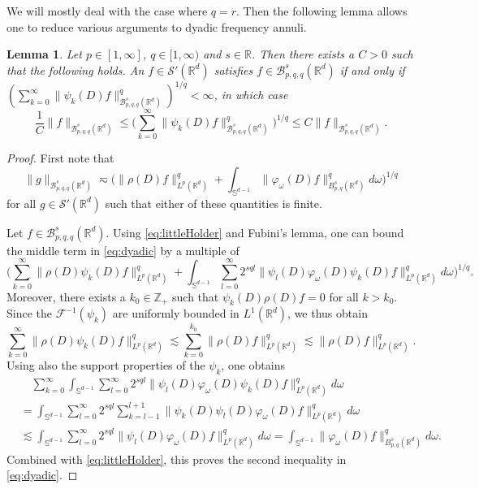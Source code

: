 \documentclass{amsart}
\newtheorem{lemma}[theorem]{Lemma}
\theoremstyle{definition}
\newcommand{\R}{\mathbb{R}}
\newcommand{\Z}{\mathbb{Z}}
\newcommand {\Rd}{\mathbb{R}^{d}}
\newcommand {\w}{\omega}
\newcommand {\ph}{\varphi}
\newcommand {\Baspqq}{\mathcal{B}^{s}_{p,q,q}(\Rd)}
\newcommand {\Sw}{\mathcal{S}}
\newcommand {\F}{{\mathcal{F}}}
\numberwithin{equation}{section}
\begin{document}
We will mostly deal with the case where $q=r$. Then 
the following lemma allows one to reduce various arguments to dyadic frequency annuli. 

\begin{lemma}\label{lem:dyadic}
Let $p\in[1,\infty]$, $q\in[1,\infty)$ and $s\in\R$. Then there exists a $C>0$ such that the following holds. An $f\in\Sw'(\Rd)$ satisfies $f\in \Baspqq$ if and only if $(\sum_{k=0}^{\infty}\|\psi_{k}(D)f\|_{\Baspqq}^{q})^{1/q}<\infty$, in which case
\begin{equation}\label{eq:dyadic}
\frac{1}{C}\|f\|_{\Baspqq}\leq \Big(\sum_{k=0}^{\infty}\|\psi_{k}(D)f\|_{\Baspqq}^{q}\Big)^{1/q}\leq C\|f\|_{\Baspqq}.
\end{equation}
\end{lemma}
\begin{proof}
First note that
\begin{equation}\label{eq:littleHolder}
\|g\|_{\Baspqq}\eqsim \Big(\| \rho(D) f \|_{L^p(\R^d)}^{q} + \int_{\mathbb{S}^{d-1}} \|\varphi_\omega(D) f \|^q_{B^{s}_{p,q}(\Rd)} d\omega \Big)^{1/q}
\end{equation}
for all $g\in\Sw'(\Rd)$ such that either of these quantities is finite.

Let $f\in\Baspqq$. Using \eqref{eq:littleHolder} and Fubini's lemma, one can bound the middle term in \eqref{eq:dyadic} by a multiple of
\[
\Big(\sum_{k=0}^{\infty}\|\rho(D)\psi_{k}(D)f\|_{L^{p}(\Rd)}^{q}+\int_{\mathbb{S}^{d-1}}\sum_{l=0}^{\infty}2^{sql}\|\psi_{l}(D)\ph_{\w}(D)\psi_{k}(D)f\|_{L^{p}(\Rd)}^{q}d\w\Big)^{1/q}.
\]
Moreover, there exists a $k_{0}\in\Z_{+}$ such that $\psi_{k}(D)\rho(D)f=0$ for all $k>k_{0}$. Since the $\F^{-1}(\psi_{k})$ are uniformly bounded in $L^{1}(\Rd)$, we thus obtain
\[
\sum_{k=0}^{\infty}\|\rho(D)\psi_{k}(D)f\|_{L^{p}(\Rd)}^{q}\lesssim \sum_{k=0}^{k_{0}}\|\rho(D)f\|_{L^{p}(\Rd)}^{q}\lesssim \|\rho(D)f\|_{L^{p}(\Rd)}^{q}.
\] 
Using also the support properties of the $\psi_{k}$, one obtains
\begin{align*}
&\quad\sum_{k=0}^{\infty}\int_{\mathbb{S}^{d-1}}\sum_{l=0}^{\infty}2^{sql}\|\psi_{l}(D)\ph_{\w}(D)\psi_{k}(D)f\|_{L^{p}(\Rd)}^{q}d\w\\
&=\int_{\mathbb{S}^{d-1}}\sum_{l=0}^{\infty}2^{sql}\sum_{k=l-1}^{l+1}\|\psi_{k}(D)\psi_{l}(D)\ph_{\w}(D)f\|_{L^{p}(\Rd)}^{q}d\w\\
&\lesssim \int_{\mathbb{S}^{d-1}}\sum_{l=0}^{\infty}2^{sql}\|\psi_{l}(D)\ph_{\w}(D)f\|_{L^{p}(\Rd)}^{q}d\w=\int_{\mathbb{S}^{d-1}}\|\ph_{\w}(D)f\|_{B^{s}_{p,q}(\Rd)}^{q}d\w.
\end{align*}
Combined with \eqref{eq:littleHolder}, this proves the second inequality in \eqref{eq:dyadic}.


\end{proof}
\end{document}
